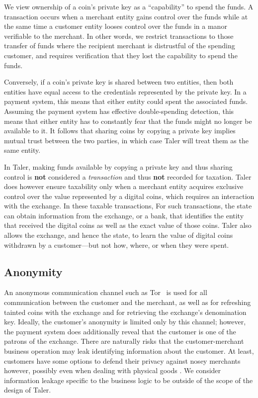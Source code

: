 \documentclass{llncs}
\begin{document}
We view ownership of a coin's private key as a ``capability'' to spend
the funds.  A transaction occurs when a merchant entity gains control
over the funds while at the same time a customer entity looses control
over the funds in a manor verifiable to the merchant.  In other words, 
we restrict transactions to those transfer of funds where the recipient
merchant is distrustful of the spending customer, and requires
verification that they lost the capability to spend the funds.

Conversely, if a coin's private key is shared between two entities,
then both entities have equal access to the credentials represented by
the private key.  In a payment system, this means that either entity
could spent the associated funds.  
Assuming the payment system has effective double-spending detection,
this means that either entity has to constantly fear that the funds
might no longer be available to it.  
It follows that sharing coins by copying a private key implies mutual
trust between the two parties, in which case Taler will treat them
as the same entity.

In Taler, making funds available by copying a private key and thus
sharing control is {\bf not} considered a {\em transaction} and
thus {\bf not} recorded for taxation.
Taler does however ensure taxability only when a merchant entity
acquires exclusive control over the value represented by a digital
coins, which requires an interaction with the exchange.  
In these taxable transactions, 
For such transactions, the state can obtain information from the
exchange, or a bank, that identifies the entity that received the
digital coins as well as the exact value of those coins.
Taler also allows the exchange, and hence the state, to learn the value
of digital coins withdrawn by a customer---but not how, where, or when
they were spent.

\subsection{Anonymity}

An anonymous communication channel such as Tor~\cite{tor-design} is
used for all communication between the customer and the merchant,
as well as for refreshing tainted coins with the exchange and for
retrieving the exchange's denomination key.
Ideally, the customer's anonymity is limited only by this channel;
however, the payment system does additionally reveal that the customer
is one of the patrons of the exchange.
There are naturally risks that the customer-merchant business operation
may leak identifying information about the customer.   At least, customers
have some options to defend their privacy against nosey merchants however,
possibly even when dealing with physical goods \cite{apod}.
We consider information leakage specific to the business logic to be
outside of the scope of the design of Taler.
\end{document}
